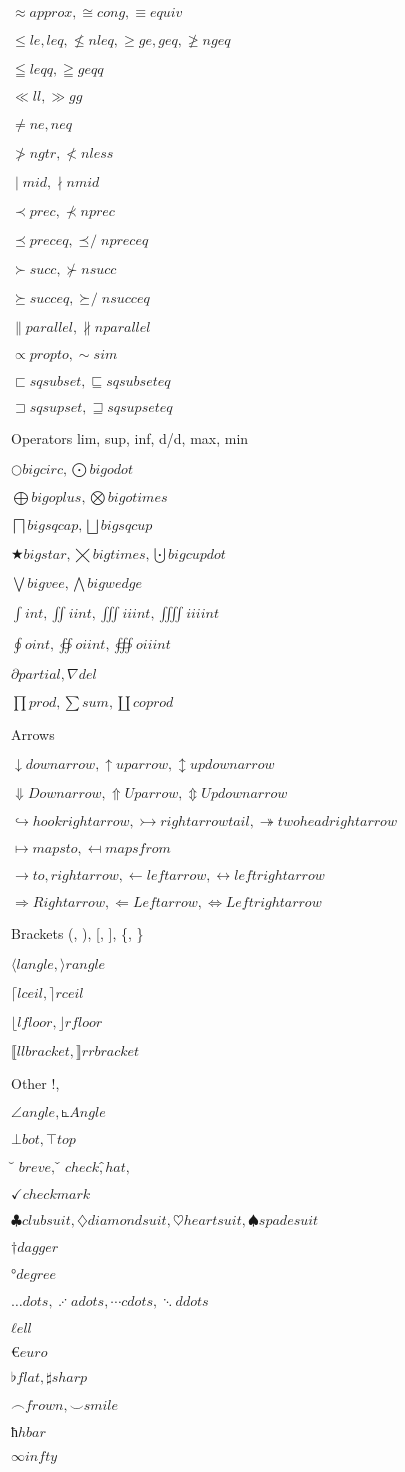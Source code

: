 \documentclass{article}
\begin{document}
$≈ approx, ≅ cong, ≡ equiv$

$≤ le, leq, ≰ nleq, ≥ ge, geq, ≱ ngeq$

$≦ leqq, ≧ geqq$

$≪ ll, ≫ gg$

$≠ ne, neq$

$≯ ngtr, ≮ nless$

$∣ mid, ∤ nmid$

$≺ prec, ⊀ nprec$

$⪯ preceq, ⪯̸ npreceq$

$≻ succ, ⊁ nsucc$

$⪰ succeq, ⪰̸ nsucceq$

$∥ parallel, ∦ nparallel$

$∝ propto, ∼ sim$

$⊏ sqsubset, ⊑ sqsubseteq$

$⊐ sqsupset, ⊒ sqsupseteq$

Operators lim, sup, inf, d/d, max, min

$○ bigcirc, ⨀ bigodot$

$⨁ bigoplus, ⨂ bigotimes$

$⨅ bigsqcap, ⨆ bigsqcup$

$★ bigstar, ⨉ bigtimes, ⨃ bigcupdot$

$⋁ bigvee, ⋀ bigwedge$

$∫ int, ∬ iint, ∭ iiint, ⨌ iiiint$

$∮ oint, ∯ oiint, ∰ oiiint$

$∂ partial, ∇ del$

$∏ prod, ∑ sum, ∐ coprod$

Arrows 

$↓ downarrow, ↑ uparrow, ↕ updownarrow$

$⇓ Downarrow, ⇑ Uparrow, ⇕ Updownarrow$

$↪ hookrightarrow, ↣ rightarrowtail, ↠ twoheadrightarrow$

$↦ mapsto, ↤ mapsfrom$

$→ to, rightarrow, ← leftarrow, ↔ leftrightarrow$

$⇒ Rightarrow, ⇐ Leftarrow, ⇔ Leftrightarrow$

Brackets (, ), [, ], \{, \}

$⟨ langle, ⟩ rangle$

$⌈ lceil, ⌉ rceil$

$⌊ lfloor, ⌋ rfloor$

$⟦ llbracket, ⟧ rrbracket$

Other !, %

$∠ angle, ⦜ Angle$

$⊥ bot, ⊤ top$

$̆ breve, ̌ check, ̂ hat,$ %

$✓ checkmark$

$♣ clubsuit, ♢ diamondsuit, ♡ heartsuit, ♠ spadesuit$

$† dagger$

$° degree$

$… dots, ⋰ adots, ⋯ cdots, ⋱ ddots$

$ℓ ell$

$€ euro$

$♭ flat, ♯ sharp$

$⌢ frown, ⌣ smile$

$ħ hbar$

$∞ infty$
\end{document}
